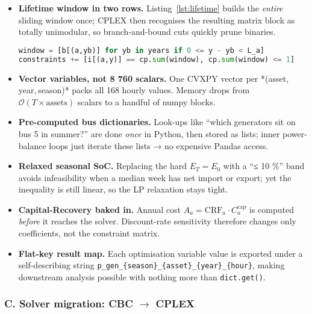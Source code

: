 \begin{itemize}
    \item \textbf{Lifetime window in two rows.}  
          Listing~\ref{lst:lifetime} builds the \emph{entire} sliding window once; CPLEX then recognises the
          resulting matrix block as totally unimodular, so branch-and-bound cuts quickly prune binaries.
          \begin{lstlisting}[language=Python, caption={Lifetime coupling snippet}, label={lst:lifetime}]
window = [b[(a,yb)] for yb in years if 0 <= y - yb < L_a]
constraints += [i[(a,y)] == cp.sum(window), cp.sum(window) <= 1]
          \end{lstlisting}
    \item \textbf{Vector variables, not 8 760 scalars.}  
          One CVXPY vector per *(asset, year, season)* packs all 168 hourly values.  
          Memory drops from \(\mathcal{O}(T\! \times\! \text{assets})\) scalars to a handful of numpy blocks.
    \item \textbf{Pre-computed bus dictionaries.}  
          Look-ups like “which generators sit on bus 5 in summer?” are done \emph{once} in Python, then stored as lists; inner power-balance loops just iterate these lists → no expensive Pandas access.
    \item \textbf{Relaxed seasonal SoC.}  
          Replacing the hard \(E_{T}=E_{0}\) with a “≤ 10 \%” band avoids infeasibility when a median week has net import or export; yet the inequality is still linear, so the LP relaxation stays tight.
    \item \textbf{Capital-Recovery baked in.}  
          Annual cost \(A_a = \mathrm{CRF}_a \cdot C^{\text{cap}}_a\) is computed \emph{before} it reaches the solver.
          Discount-rate sensitivity therefore changes only coefficients, not the constraint matrix.
    \item \textbf{Flat-key result map.}  
          Each optimisation variable value is exported under a self-describing string  
          \texttt{p\_gen\_\{season\}\_\{asset\}\_\{year\}\_\{hour\}},  
          making downstream analysis possible with nothing more than \texttt{dict.get()}.
\end{itemize}

\subsubsection*{C.  Solver migration: CBC \(\rightarrow\) CPLEX}

